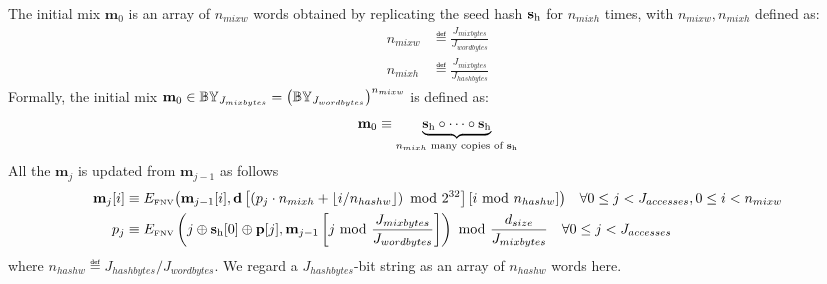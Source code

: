 The initial mix $\mathbf{m}_0$ is an array of $n_{mixw}$ words 
obtained by replicating the seed hash $\mathbf{s}_{\mathrm{h}}$ for $n_{mixh}$ times, 
with $n_{mixw},n_{mixh}$ defined as:
\begin{align}
	n_{mixw}& \eqdef  \frac{J_{mixbytes}}{J_{wordbytes}}\\
	n_{mixh}& \eqdef  \frac{J_{mixbytes}}{J_{hashbytes}}
\end{align}
Formally, the initial mix 
$\mathbf{m}_0 \in \mathbb{BY}_{J_{mixbytes}}
=\left(\mathbb{BY}_{J_{wordbytes}}\right)^{n_{mixw}}$ is defined as:
\begin{equation}
	\mathbf{m}_0 \equiv \underbrace{\mathbf{s}_{\mathrm{h}} \circ \cdots \circ \mathbf{s}_{\mathrm{h}}}_{\text{$n_{mixh}$ many copies of $\mathbf{s}_{\mathrm{h}}$}}
\end{equation}
%
All the $\mathbf{m}_j$ is updated from $\mathbf{m}_{j-1}$ as follows
\begin{align}
 \mathbf{m}_j[i] &\equiv 
	E_\text{\tiny FNV}\big(
		\mathbf{m}_{j-1}[i], 
		\mathbf{d}\left[
			\left(p_j\cdot n_{mixh} +\lfloor i/n_{hashw}\rfloor \right) \mbox{ mod } 2^{32}
		\right][i\mbox{ mod } n_{hashw}]
	\big) \quad \forall 0\le j<J_{accesses},0\le i< n_{mixw}\\ 
 {p}_j &\equiv 
	E_\text{\tiny FNV}\left(j \oplus \mathbf{s}_{\mathrm{h}}[0] \oplus \mathbf{p}[j], \mathbf{m}_{j-1}\left[j \mbox{ mod } \frac{J_{mixbytes}}{J_{wordbytes}}\right]\right) \mbox{ mod } \frac{d_{size}}{J_{mixbytes}}\quad \forall 0\le j<J_{accesses}
\end{align}
where $n_{hashw}\eqdef J_{hashbytes}/J_{wordbytes}$. We regard a $J_{hashbytes}$-bit string as an array of $n_{hashw}$ words here. 

